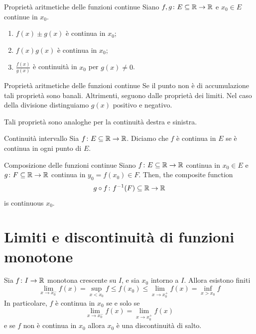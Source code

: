 \documentclass[a4paper]{article}
\begin{document}
\begin{snippetproposition}{Proprietà aritmetiche delle funzioni continue}
    Siano \(f,g\colon E \subseteq \mathbb{R} \to \mathbb{R}\) e \(x_0\in E\) continue in \(x_0\).
    \begin{enumerate}
        \item \(f(x)\pm g(x)\) è continua in \(x_0\);
        \item \(f(x)g(x)\) è continua in \(x_0\);
        \item \(\frac{f(x)}{g(x)}\) è continuità in \(x_0\) per \(g(x)\neq0\).
    \end{enumerate}
\end{snippetproposition}

\begin{snippetproof}{Proprietà aritmetiche delle funzioni continue}
    Se il punto non è di accumulazione tali proprietà sono banali.
    Altrimenti, seguono dalle proprietà dei limiti.
    Nel caso della divisione distinguiamo \(g(x)\) positivo e negativo.
\end{snippetproof}

Tali proprietà sono analoghe per la continuità destra e sinistra.

\begin{snippetdefinition}{Continuità intervallo}
    Sia \(f\colon E \subseteq \mathbb{R} \to \mathbb{R}\).
    Diciamo che \(f\) è continua in \(E\) se è continua in ogni punto di \(E\).
\end{snippetdefinition}

\begin{snippettheorem}{Composizione delle funzioni continue}
    Siano \(f\colon E \subseteq \mathbb{R} \to \mathbb{R}\) continua in \(x_0\in E\)
    e \(g\colon F \subseteq \mathbb{R} \to \mathbb{R}\) continua  in \(y_0 = f(x_0) \in F\).
    Then, the composite function
    \[
        g \circ f \colon f^{-1}(F) \subseteq \mathbb{R} \to \mathbb{R}
    \]
    is continuous \(x_0\).
\end{snippettheorem}

\pagebreak

\section{Limiti e discontinuità di funzioni monotone}

\begin{snippettheorem}{}
    Sia \(f\colon I \to \mathbb{R}\) monotona crescente su \(I\),
    e sia \(x_0\) intorno a \(I\). Allora esistono finiti
    \[
        \lim_{x\to x_0^-} f(x) = \sup_{x < x_0} f
        \leq f(x_0) \leq \lim_{x\to x_0^+} f(x) = 
        \inf_{x > x_0} f
    \]
    In particolare, \(f\) è continua in \(x_0\) se e solo se
    \[
        \lim_{x\to x_0^-} f(x) = \lim_{x\to x_0^+} f(x)
    \]
    e se \(f\) non è continua in \(x_0\) allora \(x_0\)
    è una discontinuità di salto.
\end{snippettheorem}
\end{document}
